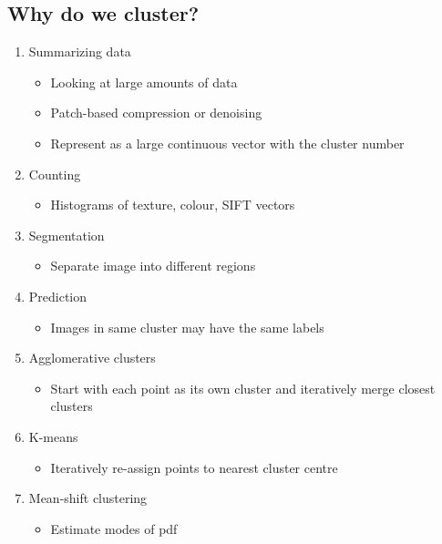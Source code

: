 \documentclass[letterpaper,12pt]{article}
\begin{document}
\subsection{Why do we cluster?}
\begin{enumerate}
 \item Summarizing data
       \begin{itemize}
        \item Looking at large amounts of data
        \item Patch-based compression or denoising
        \item Represent as a large continuous vector with the cluster number
       \end{itemize}
 \item Counting
       \begin{itemize}
        \item Histograms of texture, colour, SIFT vectors
       \end{itemize}
 \item Segmentation
       \begin{itemize}
        \item Separate image into different regions
       \end{itemize}
 \item Prediction
       \begin{itemize}
        \item Images in same cluster may have the same labels
       \end{itemize}
 \item Agglomerative clusters
       \begin{itemize}
        \item Start with each point as its own cluster and iteratively merge closest clusters
       \end{itemize}
 \item K-means
       \begin{itemize}
        \item Iteratively re-assign points to nearest cluster centre
       \end{itemize}
 \item Mean-shift clustering
       \begin{itemize}
        \item Estimate modes of pdf
       \end{itemize}
\end{enumerate}
\end{document}

